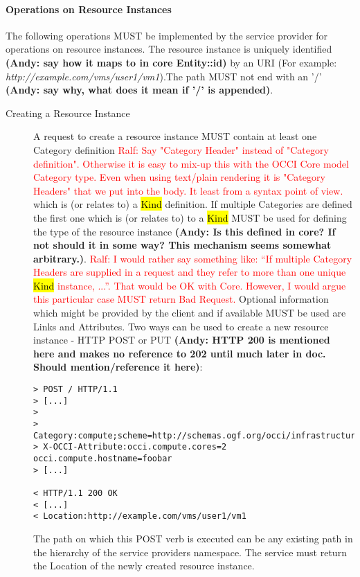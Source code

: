 \documentclass[10pt,a4paper]{article}
\newcommand{\ralf}[1]{\textcolor{red}{Ralf: #1}}
\begin{document}
\paragraph{Operations on Resource Instances}
The following operations MUST be implemented by the service provider
for operations on resource instances. The resource instance is
uniquely identified \textbf{(Andy: say how it maps to in core Entity::id)} 
by an URI (For example:
\emph{http://example.com/vms/user1/vm1}).The path MUST not end
with an '/' \textbf{(Andy: say why, what does it mean if '/' is appended)}.

\begin{description}
\item[Creating a Resource Instance] A request to create a resource
  instance MUST contain at least one Category definition
  \ralf{Say "Category Header" instead of "Category definition". Otherwise it is
  easy to mix-up this with the OCCI Core model Category type.  Even when using
  text/plain rendering it is "Category Headers" that we put into the body. It
  least from a syntax point of view.}
  which is (or
  relates to) a \hl{Kind} definition. If multiple Categories are
  defined the first one which is (or relates to) to a \hl{Kind} MUST
  be used for defining the type of the resource instance \textbf{(Andy: Is this defined in core? 
  If not should it in some way? This mechanism seems somewhat arbitrary.)}.
  \ralf{I would rather say something like: ``If multiple Category Headers are
  supplied in a request and they refer to more than one unique \hl{Kind}
  instance, ...''. That would be OK with Core. However, I would argue this
  particular case MUST return Bad Request.}
  Optional
  information which might be provided by the client and if available
  MUST be used are Links and Attributes. Two ways can be used to
  create a new resource instance - HTTP POST or PUT \textbf{(Andy: HTTP 200 is mentioned 
  here and makes no reference to 202 until much later in doc. Should mention/reference it here)}:
\begin{verbatim}
> POST / HTTP/1.1
> [...]
> 
> Category:compute;scheme=http://schemas.ogf.org/occi/infrastructure
> X-OCCI-Attribute:occi.compute.cores=2 occi.compute.hostname=foobar
> [...]
 
< HTTP/1.1 200 OK
< [...]
< Location:http://example.com/vms/user1/vm1
\end{verbatim}
  The path on which this POST verb is executed can be any existing
  path in the hierarchy of the service providers namespace. The
  service must return the Location of the newly created resource
  instance.


\end{description}
\end{document}
